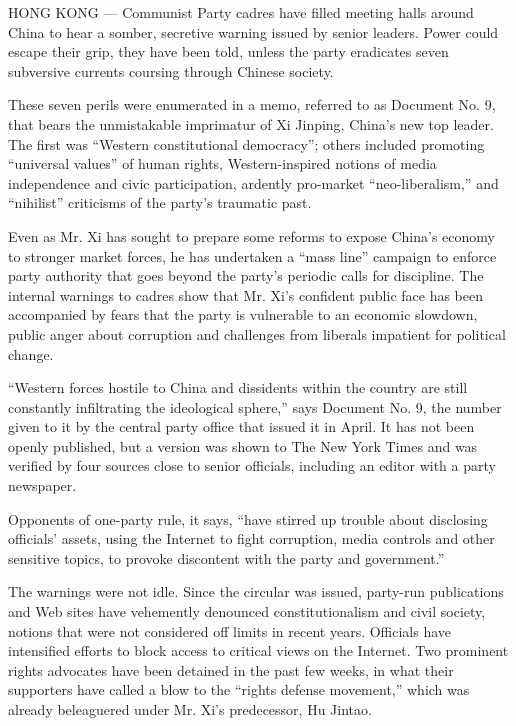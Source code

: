HONG KONG --- Communist Party cadres have filled meeting halls around
China to hear a somber, secretive warning issued by senior leaders.
Power could escape their grip, they have been told, unless the party
eradicates seven subversive currents coursing through Chinese society.

These seven perils were enumerated in a memo, referred to as Document
No. 9, that bears the unmistakable imprimatur of Xi Jinping, China's new
top leader. The first was ``Western constitutional democracy''; others
included promoting ``universal values'' of human rights,
Western-inspired notions of media independence and civic participation,
ardently pro-market ``neo-liberalism,'' and ``nihilist'' criticisms of
the party's traumatic past.

Even as Mr. Xi has sought to prepare some reforms to expose China's
economy to stronger market forces, he has undertaken a ``mass line''
campaign to enforce party authority that goes beyond the party's
periodic calls for discipline. The internal warnings to cadres show that
Mr. Xi's confident public face has been accompanied by fears that the
party is vulnerable to an economic slowdown, public anger about
corruption and challenges from liberals impatient for political change.

``Western forces hostile to China and dissidents within the country are
still constantly infiltrating the ideological sphere,'' says Document
No. 9, the number given to it by the central party office that issued it
in April. It has not been openly published, but a version was shown to
The New York Times and was verified by four sources close to senior
officials, including an editor with a party newspaper.

Opponents of one-party rule, it says, ``have stirred up trouble about
disclosing officials' assets, using the Internet to fight corruption,
media controls and other sensitive topics, to provoke discontent with
the party and government.''

The warnings were not idle. Since the circular was issued, party-run
publications and Web sites have vehemently denounced constitutionalism
and civil society, notions that were not considered off limits in recent
years. Officials have intensified efforts to block access to critical
views on the Internet. Two prominent rights advocates have been detained
in the past few weeks, in what their supporters have called a blow to
the ``rights defense movement,'' which was already beleaguered under Mr.
Xi's predecessor, Hu Jintao.

